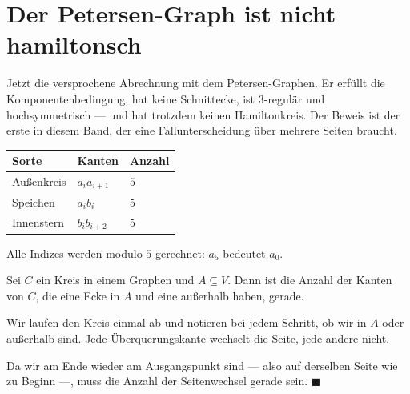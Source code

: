 \section{Der Petersen-Graph ist nicht hamiltonsch}

Jetzt die versprochene Abrechnung mit dem Petersen-Graphen. Er erfüllt die Komponentenbedingung, hat keine Schnittecke, ist $3$-regulär und hochsymmetrisch --- und hat trotzdem keinen Hamiltonkreis. Der Beweis ist der erste in diesem Band, der eine Fallunterscheidung über mehrere Seiten braucht.

\begin{merksatz}
\begin{center}
\end{center}

\begin{center}
\renewcommand{\arraystretch}{1.45}
\begin{tabular}{@{}P{2.4cm}P{3.0cm}P{2.2cm}@{}}
\toprule
\textbf{Sorte} & \textbf{Kanten} & \textbf{Anzahl}\\
\midrule
Außenkreis & $a_i a_{i+1}$ & $5$\\
Speichen & $a_i b_i$ & $5$\\
Innenstern & $b_i b_{i+2}$ & $5$\\
\bottomrule
\end{tabular}
\end{center}
Alle Indizes werden modulo $5$ gerechnet: $a_5$ bedeutet $a_0$.
\end{merksatz}

\begin{merksatz}
Sei $C$ ein Kreis in einem Graphen und $A \subseteq V$. Dann ist die Anzahl der Kanten von $C$, die eine Ecke in $A$ und eine außerhalb haben, gerade.

Wir laufen den Kreis einmal ab und notieren bei jedem Schritt, ob wir in $A$ oder außerhalb sind. Jede Überquerungskante wechselt die Seite, jede andere nicht.

Da wir am Ende wieder am Ausgangspunkt sind --- also auf derselben Seite wie zu Beginn ---, muss die Anzahl der Seitenwechsel gerade sein. $\blacksquare$
\end{merksatz}

